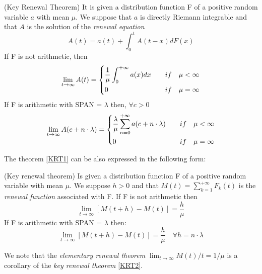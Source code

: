 \begin{theorem}
	(Key Renewal Theorem) It is given a distribution function F of a positive random variable $a$ with mean $\mu$. We suppose that $a$ is directly Riemann integrable and that $A$ is the solution of the \textit{renewal equation}
	\begin{equation}
		A(t)=a(t)+\int_{0}^{t}A(t-x)dF(x)
	\end{equation}
	If F is not arithmetic, then
	\begin{equation*}
		\lim_{t \rightarrow \infty} A(t) =
		\begin{dcases}
			\frac{1}{\mu} \int_{0}^{+\infty}a(x)dx \quad & if \quad \mu < \infty \\
			0 \quad & if \quad \mu = \infty
		\end{dcases}
	\end{equation*}
	If F is arithmetic with SPAN = $\lambda$ then, $\forall c > 0$
	\begin{equation*}
		\lim_{t \rightarrow \infty} A(c+n\cdot \lambda) =
		\begin{dcases}
			\frac{\lambda}{\mu} \sum_{n=0}^{+\infty}a(c+n \cdot \lambda) \quad & if 	\quad \mu<\infty \\
			0 \quad & if \quad \mu = \infty
		\end{dcases}
	\end{equation*}
\label{KRT1}
\end{theorem}

The theorem \ref{KRT1} can be also expressed in the following form:

\begin{theorem}
	(Key renewal theorem) Is given a distribution function F of a positive random variable with mean $\mu$. We suppose $h>0$ and that $M(t)=\sum_{k=1}^{+\infty} F_{k}(t)$ is the \textit{renewal function} associated with F.
	If F is not arithmetic then
	\begin{equation}
		\lim_{t \rightarrow \infty} [M(t+h)-M(t)]=\frac{h}{\mu}
	\end{equation}
	If F is arithmetic with SPAN = $\lambda$ then:
	\begin{equation}
		\lim_{t \rightarrow \infty} [M(t+h)-M(t)]=\frac{h}{\mu} \quad \forall h = n \cdot \lambda
	\end{equation}
	\label{KRT2}
\end{theorem}

We note that the \textit{elementary renewal theorem} $\lim_{t \to \infty} M(t) / t = 1 / \mu$ is a corollary of the \textit{key renewal theorem} \ref{KRT2}.

